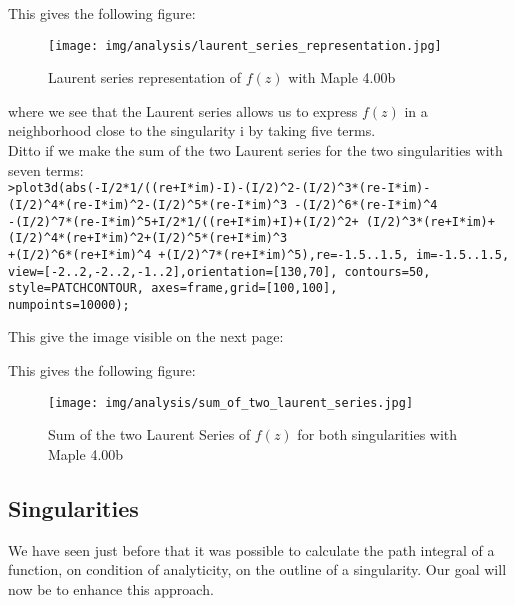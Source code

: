 	\pagebreak
	\begin{tcolorbox}[colframe=black,colback=white,sharp corners]
	This gives the following figure:
	\begin{figure}[H]
		\centering
		\texttt{[image: img/analysis/laurent\_series\_representation.jpg]}
		\caption{Laurent series representation of $f(z)$ with Maple 4.00b}
	\end{figure}
	where we see that the Laurent series allows us to express $f (z)$ in a neighborhood close to the singularity $\mathrm{i}$ by taking five terms.\\
	
	Ditto if we make the sum of the two Laurent series for the two singularities with seven terms:\\
	
	\texttt{>plot3d(abs(-I/2*1/((re+I*im)-I)-(I/2)\string^2-(I/2)\string^3*(re-I*im)-\\
	(I/2)\string^4*(re-I*im)\string^2-(I/2)\string^5*(re-I*im)\string^3 -(I/2)\string^6*(re-I*im)\string^4\\
	-(I/2)\string^7*(re-I*im)\string^5+I/2*1/((re+I*im)+I)+(I/2)\string^2+
(I/2)\string^3*(re+I*im)+(I/2)\string^4*(re+I*im)\string^2+(I/2)\string^5*(re+I*im)\string^3\\
	+(I/2)\string^6*(re+I*im)\string^4
+(I/2)\string^7*(re+I*im)\string^5),re=-1.5..1.5, im=-1.5..1.5, view=[-2..2,-2..2,-1..2],orientation=[130,70], contours=50, style=PATCHCONTOUR, axes=frame,grid=[100,100],\\
numpoints=10000);}

	This give the image visible on the next page:
	\end{tcolorbox}
	
	\pagebreak
	\begin{tcolorbox}[colframe=black,colback=white,sharp corners]
	This gives the following figure:
	\begin{figure}[H]
		\centering
		\texttt{[image: img/analysis/sum\_of\_two\_laurent\_series.jpg]}
		\caption{Sum of the two Laurent Series of $f(z)$ for both singularities with Maple 4.00b}
	\end{figure}
	\end{tcolorbox}
	
	\subsection{Singularities}
	We have seen just before that it was possible to calculate the path integral of a function, on condition of analyticity, on the outline of a singularity. Our goal will now be to enhance this approach.
	
